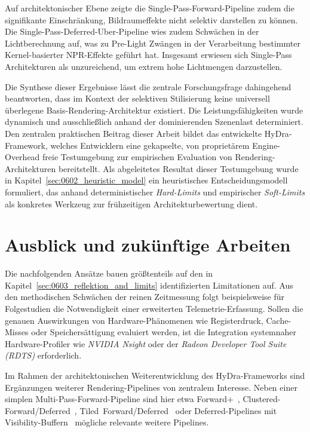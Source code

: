 Auf architektonischer Ebene zeigte die Single-Pass-Forward-Pipeline zudem die signifikante Einschränkung,
Bildraumeffekte nicht selektiv darstellen zu können.
Die Single-Pass-Deferred-Uber-Pipeline wies zudem Schwächen in der Lichtberechnung auf, was zu Pre-Light Zwängen in
der Verarbeitung bestimmter Kernel-basierter \ac{NPR}-Effekte geführt hat.
Insgesamt erwiesen sich Single-Pass Architekturen als unzureichend, um extrem hohe Lichtmengen darzustellen.

Die Synthese dieser Ergebnisse lässt die zentrale Forschungsfrage dahingehend beantworten, dass im Kontext der
selektiven Stilisierung keine universell überlegene Basis-Rendering-Architektur existiert.
Die Leistungsfähigkeiten wurde dynamisch und ausschließlich anhand der dominierenden Szenenlast determiniert.
Den zentralen praktischen Beitrag dieser Arbeit bildet das entwickelte \ac{HyDra}-Framework, welches Entwicklern eine
gekapselte, von proprietärem Engine-Overhead freie Testumgebung zur empirischen Evaluation von Rendering-Architekturen
bereitstellt.
Als abgeleitetes Resultat dieser Testumgebung wurde in Kapitel~\ref{sec:0602_heuristic_model} ein heuristisches
Entscheidungsmodell formuliert, das anhand deterministischer \textit{Hard-Limits} und empirischer \textit{Soft-Limits}
als konkretes Werkzeug zur frühzeitigen Architekturbewertung dient.


\section{Ausblick und zukünftige Arbeiten}
\label{sec:0702_future_work}

Die nachfolgenden Ansätze bauen größtenteils auf den in Kapitel~\ref{sec:0603_reflektion_and_limits} identifizierten
Limitationen auf.
Aus den methodischen Schwächen der reinen Zeitmessung folgt beispielsweise für Folgestudien die Notwendigkeit einer
erweiterten Telemetrie-Erfassung.
Sollen die genauen Auswirkungen von Hardware-Phänomenen wie Registerdruck, Cache-Misses oder Speichersättigung
evaluiert werden, ist die Integration systemnaher Hardware-Profiler wie \textit{NVIDIA Nsight} oder der \textit{Radeon
Developer Tool Suite (RDTS)} erforderlich.

Im Rahmen der architektonischen Weiterentwicklung des \ac{HyDra}-Frameworks sind Ergänzungen weiterer
Rendering-Pipelines von zentralem Interesse.
Neben einer simplen Multi-Pass-Forward-Pipeline sind hier etwa
Forward+~\parencite[vgl.][]{haradaForwardBringingDeferred2012},
Clustered-Forward/Deferred~\parencite[vgl.][]{olssonClusteredDeferredForward2012},
Tiled~Forward/Deferred~\parencite[vgl.][]{olssonTiledClusteredForward2012} oder Deferred-Pipelines mit
Visibility-Buffern~\parencite[vgl.][]{burnsVisibilityBufferCacheFriendly2013} mögliche relevante weitere Pipelines.

